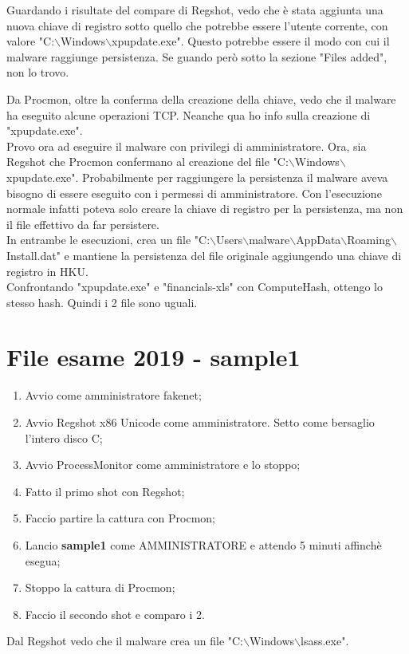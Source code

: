 \documentclass[a4paper]{book}
\begin{document}
Guardando i risultate del compare di Regshot, vedo che è stata aggiunta una nuova chiave di registro sotto quello che potrebbe essere l'utente corrente, con valore "C:$\backslash$Windows$\backslash$xpupdate.exe". Questo potrebbe essere il modo con cui il malware raggiunge persistenza. Se guando però sotto la sezione "Files added", non lo trovo. 

Da Procmon, oltre la conferma della creazione della chiave, vedo che il malware ha eseguito alcune operazioni TCP. Neanche qua ho info sulla creazione di "xpupdate.exe".
\\

Provo ora ad eseguire il malware con privilegi di amministratore. Ora, sia Regshot che Procmon confermano al creazione del file "C:$\backslash$Windows$\backslash$xpupdate.exe". Probabilmente per raggiungere la persistenza il malware aveva bisogno di essere eseguito con i permessi di amministratore.
Con l'esecuzione normale infatti poteva solo creare la chiave di registro per la persistenza, ma non il file effettivo da far persistere. 
\\

In entrambe le esecuzioni, crea un file "C:$\backslash$Users$\backslash$malware$\backslash$AppData$\backslash$Roaming$\backslash$Install.dat" e mantiene la persistenza del file originale aggiungendo una chiave di registro in HKU.
\\

Confrontando "xpupdate.exe" e "financials-xls" con ComputeHash, ottengo lo stesso hash. Quindi i 2 file sono uguali.

\section{File esame 2019 - sample1}

\begin{enumerate}
    \item Avvio come amministratore fakenet;
    \item Avvio Regshot x86 Unicode come amministratore. Setto come bersaglio l'intero disco C;
    \item Avvio ProcessMonitor come amministratore e lo stoppo;
    \item Fatto il primo shot con Regshot;
    \item Faccio partire la cattura con Procmon;
    \item Lancio \textbf{sample1} come AMMINISTRATORE e attendo 5 minuti affinchè esegua;
    \item Stoppo la cattura di Procmon;
    \item Faccio il secondo shot e comparo i 2.
\end{enumerate}

Dal Regshot vedo che il malware crea un file "C:$\backslash$Windows$\backslash$lsass.exe".
\end{document}
